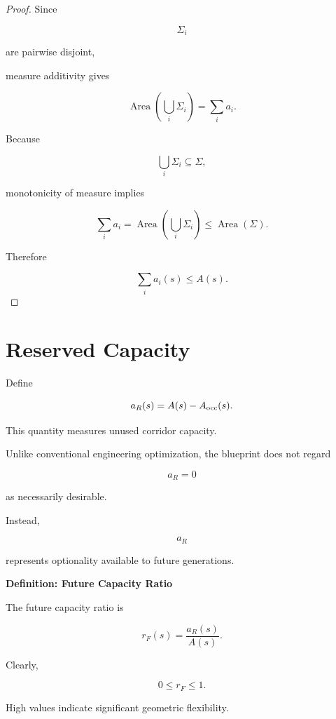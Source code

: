 \documentclass[11pt,fleqn]{book}
\numberwithin{equation}{chapter}
\newenvironment{definition}[1]
  {\begin{definitionEnv}
   \noindent\textbf{Definition: #1}\par\smallskip}
  {\end{definitionEnv}}
\theoremstyle{plain}
\theoremstyle{definition}
\theoremstyle{remark}
\begin{document}
\begin{proof}

Since

\[
\Sigma_i
\]

are pairwise disjoint,

measure additivity gives

\[
\operatorname{Area}
\left(
\bigcup_i
\Sigma_i
\right)
=
\sum_i
a_i.
\]

Because

\[
\bigcup_i
\Sigma_i
\subseteq
\Sigma,
\]

monotonicity of measure implies

\[
\sum_i
a_i
=
\operatorname{Area}
\left(
\bigcup_i
\Sigma_i
\right)
\le
\operatorname{Area}
(\Sigma).
\]

Therefore

\[
\boxed{
\sum_i
a_i(s)
\le
A(s).
}
\]

\end{proof}


\section{Reserved Capacity}

Define

\[
a_R(s)
=
A(s)
-
A_{\rm occ}(s).
\]

This quantity measures unused corridor capacity.

Unlike conventional engineering optimization,
the blueprint does not regard

\[
a_R=0
\]

as necessarily desirable.

Instead,

\[
a_R
\]

represents optionality available to future generations.


\begin{definition}{Future Capacity Ratio}

The future capacity ratio is

\[
r_F(s)
=
\frac{
a_R(s)
}{
A(s)
}.
\]

Clearly,

\[
0
\le
r_F
\le
1.
\]

\end{definition}

High values indicate significant geometric flexibility.
\end{document}

